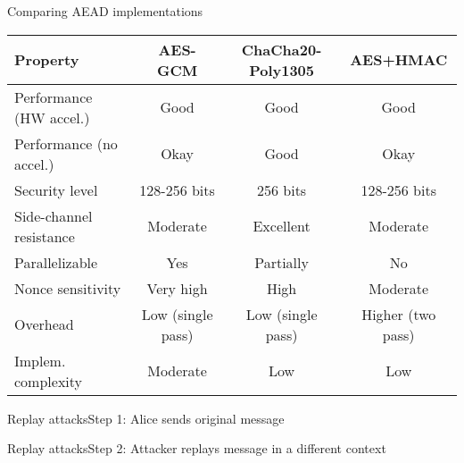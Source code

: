 \documentclass[aspectratio=169, lualatex, handout]{beamer}
\begin{document}
\begin{frame}{Comparing AEAD implementations}
	\begin{center}
		\begin{tabular}{|l|c|c|c|}
			\hline
			\textbf{Property}       & \textbf{AES-GCM}  & \textbf{ChaCha20-Poly1305} & \textbf{AES+HMAC} \\
			\hline
			Performance (HW accel.) & Good              & Good                       & Good              \\
			\hline
			Performance (no accel.) & Okay              & Good                       & Okay              \\
			\hline
			Security level          & 128-256 bits      & 256 bits                   & 128-256 bits      \\
			\hline
			Side-channel resistance & Moderate          & Excellent                  & Moderate          \\
			\hline
			Parallelizable          & Yes               & Partially                  & No                \\
			\hline
			Nonce sensitivity       & Very high         & High                       & Moderate          \\
			\hline
			Overhead                & Low (single pass) & Low (single pass)          & Higher (two pass) \\
			\hline
			Implem. complexity      & Moderate          & Low                        & Low               \\
			\hline
		\end{tabular}
	\end{center}
\end{frame}

\begin{frame}{Replay attacks}{Step 1: Alice sends original message}
\end{frame}

\begin{frame}{Replay attacks}{Step 2: Attacker replays message in a different context}
\end{frame}
\end{document}
